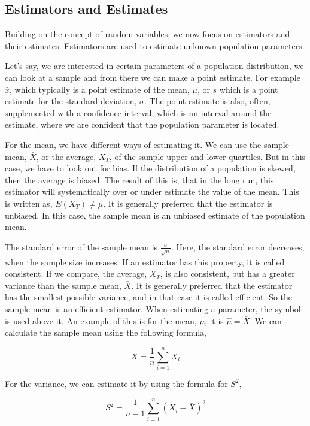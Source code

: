 \subsection{Estimators and Estimates}
Building on the concept of random variables, we now focus on estimators and their estimates. Estimators are used to estimate unknown population parameters. \newline

\noindent Let's say, we are interested in certain parameters of a population distribution, we can look at a sample and from there we can make a point estimate. For example $\bar{x}$, which typically is a point estimate of the mean, $\mu$, or $s$ which is a point estimate for the standard deviation, $\sigma$. The point estimate is also, often, supplemented with a confidence interval, which is an interval around the estimate, where we are confident that the population parameter is located.
\newline

\noindent For the mean, we have different ways of estimating it. We can use the sample mean, $\bar{X}$, or the average, $X_T$, of the sample upper and lower quartiles. 
But in this case, we have to look out for bias. If the distribution of a population is skewed, then the average is biased. The result of this is, that in the long run, this estimator will systematically over or under estimate the value of the mean. This is written as,
\newline
$E(X_T) \neq \mu$.
\newline
It is generally preferred that the estimator is unbiased. In this case, the sample mean is an unbiased estimate of the population mean.
\newline

\noindent The standard error of the sample mean is $\frac{\sigma}{\sqrt{n}}$. Here, the standard error decreases, when the sample size increases. If an estimator has this property, it is called consistent. If we compare, the average, $X_T$, is also consistent, but has a greater variance than the sample mean, $\bar{X}$. 
\newline
It is generally preferred that the estimator has the smallest possible variance, and in that case it is called efficient. So the sample mean is an efficient estimator.
\newline
When estimating a parameter, the symbol $\hat{}$ is used above it. An example of this is for the mean, $\mu$, it is $\hat{\mu} = \bar{X}$.
\newline
We can calculate the sample mean using the following formula,

\begin{equation}
	\bar{X}=\frac{1}{n} \sum_{i=1}^{n}X_i
\end{equation}


\noindent For the variance, we can estimate it by using the formula for $S^2$,

\begin{equation}
	S^2=\frac{1}{n-1} \sum_{i=1}^{n}(X_i-\bar{X})^2
\end{equation}
